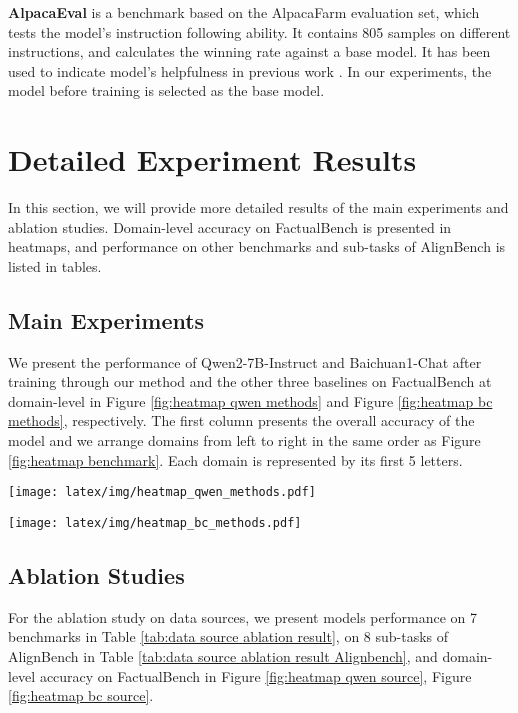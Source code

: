 \textbf{AlpacaEval} \citep{alpaca_eval} is a benchmark based on the AlpacaFarm \citep{dubois2023alpacafarm} evaluation set, which tests the model's instruction following ability. It contains 805 samples on different instructions, and calculates the winning rate against a base model. It has been used to indicate model's helpfulness in previous work \citep{flame}. In our experiments, the model before training is selected as the base model.

\section{Detailed Experiment Results}
In this section, we will provide more detailed results of the main experiments and ablation studies. Domain-level accuracy on FactualBench is presented in heatmaps, and performance on other benchmarks and sub-tasks of AlignBench is listed in tables.

\subsection{Main Experiments}
\label{cha:detailed main experiment result}
We present the performance of Qwen2-7B-Instruct and Baichuan1-Chat after training through our method and the other three baselines on FactualBench at domain-level in Figure \ref{fig:heatmap qwen methods} and Figure \ref{fig:heatmap bc methods}, respectively. The first column presents the overall accuracy of the model and we arrange domains from left to right in the same order as Figure \ref{fig:heatmap benchmark}. Each domain is represented by its first 5 letters.

\begin{figure*}[ht]
  \texttt{[image: latex/img/heatmap\_qwen\_methods.pdf]} 
  \caption {Qwen2-7B-Instruct performance on FactualBench after different training methods.}
  \label{fig:heatmap qwen methods}
\end{figure*}

\begin{figure*}[ht]
  \texttt{[image: latex/img/heatmap\_bc\_methods.pdf]} 
  \caption {Baichuan1-Chat performance on FactualBench after different training methods.}
  \label{fig:heatmap bc methods}
\end{figure*}

\subsection{Ablation Studies}
\label{cha:detailed ablation experiment result}
For the ablation study on data sources, we present models performance on 7 benchmarks in Table \ref{tab:data source ablation result}, on 8 sub-tasks of AlignBench in Table \ref{tab:data source ablation result Alignbench}, and domain-level accuracy on FactualBench in Figure \ref{fig:heatmap qwen source}, Figure \ref{fig:heatmap bc source}. 

